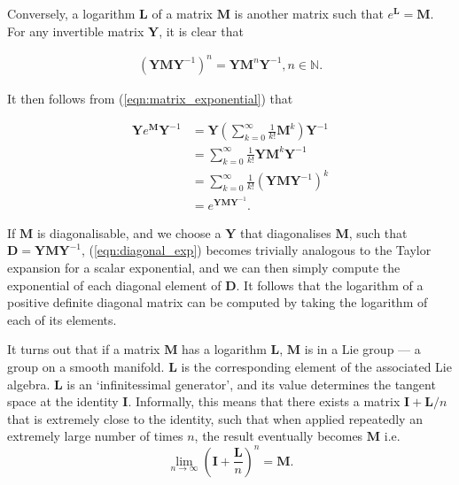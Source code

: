         Conversely, a logarithm $\mathbf{L}$ of a matrix $\mathbf{M}$ is another matrix such that $e^\mathbf{L} = \mathbf{M}$. For any invertible matrix $\mathbf{Y}$, it is clear that
        
        \begin{gather}
          (\mathbf{YM}\mathbf{Y}^{-1})^n = \mathbf{Y}\mathbf{M}^n\mathbf{Y}^{-1}, n \in \mathbb{N}.
        \end{gather}
        
        It then follows from (\ref{eqn:matrix_exponential}) that
        
        \begin{align}
          \mathbf{Y}e^{\mathbf{M}}\mathbf{Y}^{-1} &= \mathbf{Y}\left(\sum_{k=0}^{\infty}\frac{1}{k!}\mathbf{M}^k\right)\mathbf{Y}^{-1} \\
                                                  &= \sum_{k=0}^{\infty}\frac{1}{k!}\mathbf{Y}\mathbf{M}^k\mathbf{Y}^{-1} \\
                                                  &= \sum_{k=0}^{\infty}\frac{1}{k!}(\mathbf{YM}\mathbf{Y}^{-1})^k \label{eqn:diagonal_exp} \\
                                                  &= e^{\mathbf{YM}\mathbf{Y}^{-1}}.
        \end{align}
        
        If $\mathbf{M}$ is diagonalisable, and we choose a $\mathbf{Y}$ that diagonalises $\mathbf{M}$, such that $\mathbf{D} = \mathbf{YMY}^{-1}$, (\ref{eqn:diagonal_exp}) becomes trivially analogous to the Taylor expansion for a scalar exponential, and we can then simply compute the exponential of each diagonal element of $\mathbf{D}$. It follows that the logarithm of a positive definite diagonal matrix can be computed by taking the logarithm of each of its elements.
        
        It turns out that if a matrix $\mathbf{M}$ has a logarithm $\mathbf{L}$, $\mathbf{M}$ is in a Lie group --- a group on a smooth manifold. $\mathbf{L}$ is the corresponding element of the associated Lie algebra. $\mathbf{L}$ is an `infinitessimal generator', and its value determines the tangent space at the identity $\mathbf{I}$. Informally, this means that there exists a matrix $\mathbf{I} + \mathbf{L} / n$ that is extremely close to the identity, such that when applied repeatedly an extremely large number of times $n$, the result eventually becomes $\mathbf{M}$ i.e.
        \begin{equation}
          \lim_{n\to\infty} (\mathbf{I} +  \frac{\mathbf{L}}{n})^n = \mathbf{M}.
        \end{equation}
        
